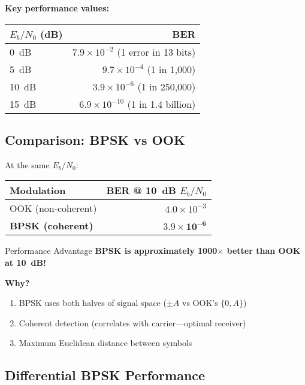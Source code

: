 \textbf{Key performance values:}

\begin{center}
\begin{tabular}{@{}lr@{}}
\toprule
$E_b/N_0$ (dB) & BER \\
\midrule
0~dB & $7.9 \times 10^{-2}$ (1 error in 13 bits) \\
5~dB & $9.7 \times 10^{-4}$ (1 in 1,000) \\
10~dB & $3.9 \times 10^{-6}$ (1 in 250,000) \\
15~dB & $6.9 \times 10^{-10}$ (1 in 1.4 billion) \\
\bottomrule
\end{tabular}
\end{center}

\subsection{Comparison: BPSK vs OOK}

At the same $E_b/N_0$:

\begin{center}
\begin{tabular}{@{}lr@{}}
\toprule
Modulation & BER @ 10~dB $E_b/N_0$ \\
\midrule
OOK (non-coherent) & $4.0 \times 10^{-3}$ \\
\textbf{BPSK (coherent)} & $\mathbf{3.9 \times 10^{-6}}$ \\
\bottomrule
\end{tabular}
\end{center}

\begin{calloutbox}[colback=green!5!white,colframe=green!75!black]{ Performance Advantage}
\textbf{BPSK is approximately 1000$\times$ better than OOK at 10~dB!}

\textbf{Why?}
\begin{enumerate}
\item BPSK uses both halves of signal space ($\pm A$ vs OOK's $\{0, A\}$)
\item Coherent detection (correlates with carrier---optimal receiver)
\item Maximum Euclidean distance between symbols
\end{enumerate}
\end{calloutbox}

\subsection{Differential BPSK Performance}

